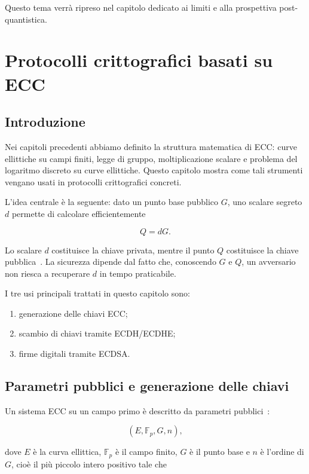\documentclass[12pt,a4paper,oneside]{report}
\begin{document}
Questo tema verrà ripreso nel capitolo dedicato ai limiti e alla prospettiva post-quantistica.

\chapter{Protocolli crittografici basati su ECC}

\section{Introduzione}

Nei capitoli precedenti abbiamo definito la struttura matematica di ECC: curve ellittiche su campi finiti, legge di gruppo, moltiplicazione scalare e problema del logaritmo discreto su curve ellittiche. Questo capitolo mostra come tali strumenti vengano usati in protocolli crittografici concreti.

L'idea centrale è la seguente: dato un punto base pubblico \(G\), uno scalare segreto \(d\) permette di calcolare efficientemente

\[
Q=dG.
\]

Lo scalare \(d\) costituisce la chiave privata, mentre il punto \(Q\) costituisce la chiave pubblica~\cite{margara_ec,sec1}. La sicurezza dipende dal fatto che, conoscendo \(G\) e \(Q\), un avversario non riesca a recuperare \(d\) in tempo praticabile.

I tre usi principali trattati in questo capitolo sono:

\begin{enumerate}
    \item generazione delle chiavi ECC;
    \item scambio di chiavi tramite ECDH/ECDHE;
    \item firme digitali tramite ECDSA.
\end{enumerate}

\section{Parametri pubblici e generazione delle chiavi}

Un sistema ECC su un campo primo è descritto da parametri pubblici~\cite{margara_ec,sec1}:

\[
(E,\mathbb{F}_p,G,n),
\]

dove \(E\) è la curva ellittica, \(\mathbb{F}_p\) è il campo finito, \(G\) è il punto base e \(n\) è l'ordine di \(G\), cioè il più piccolo intero positivo tale che
\end{document}
